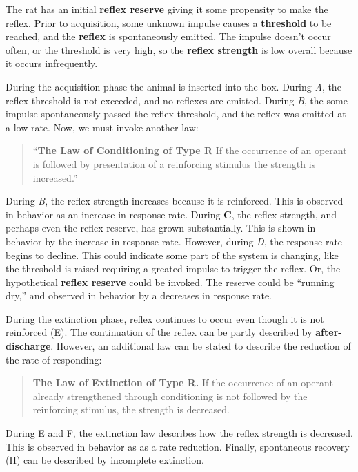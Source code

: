 \documentclass[
  oneside,
  12pt]{crumpbook}
\begin{document}
The rat has an initial \textbf{reflex reserve} giving it some propensity to make the reflex. Prior to acquisition, some unknown impulse causes a \textbf{threshold} to be reached, and the \textbf{reflex} is spontaneously emitted. The impulse doesn't occur often, or the threshold is very high, so the \textbf{reflex strength} is low overall because it occurs infrequently.

During the acquisition phase the animal is inserted into the box. During \emph{A}, the reflex threshold is not exceeded, and no reflexes are emitted. During \emph{B}, the some impulse spontaneously passed the reflex threshold, and the reflex was emitted at a low rate. Now, we must invoke another law:

\begin{quote}
``\textbf{The Law of Conditioning of Type R} If the occurrence of an operant is followed by presentation of a reinforcing stimulus the strength is increased.''
\end{quote}

During \emph{B}, the reflex strength increases because it is reinforced. This is observed in behavior as an increase in response rate. During \textbf{C}, the reflex strength, and perhaps even the reflex reserve, has grown substantially. This is shown in behavior by the increase in response rate. However, during \emph{D}, the response rate begins to decline. This could indicate some part of the system is changing, like the threshold is raised requiring a greated impulse to trigger the reflex. Or, the hypothetical \textbf{reflex reserve} could be invoked. The reserve could be ``running dry,'' and observed in behavior by a decreases in response rate.

During the extinction phase, reflex continues to occur even though it is not reinforced (E). The continuation of the reflex can be partly described by \textbf{after-discharge}. However, an additional law can be stated to describe the reduction of the rate of responding:

\begin{quote}
\textbf{The Law of Extinction of Type R.} If the occurrence of an operant already strengthened through conditioning is not followed by the reinforcing stimulus, the strength is decreased.
\end{quote}

During E and F, the extinction law describes how the reflex strength is decreased. This is observed in behavior as as a rate reduction. Finally, spontaneous recovery (H) can be described by incomplete extinction.
\end{document}
